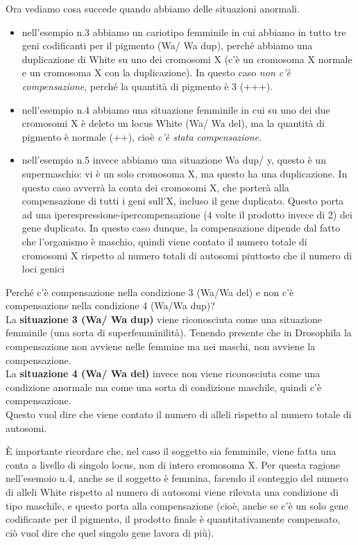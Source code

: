 \documentclass[11pt]{book}
\begin{document}
Ora vediamo cosa succede quando abbiamo delle situazioni anormali.

\begin{itemize}
\item nell'esempio n.3 abbiamo un cariotipo femminile in cui abbiamo in tutto tre geni codificanti per il pigmento (Wa/ Wa dup), perché abbiamo una duplicazione di White su uno dei cromosomi X (c’è un cromosoma X normale e un cromosoma X con la duplicazione). In questo caso \emph{non c’è compensazione}, perché la quantità di pigmento è 3 (+++).
\item nell'esempio n.4 abbiamo una situazione femminile in cui su uno dei due cromosomi X è deleto un locus White (Wa/ Wa del), ma la quantità di pigmento è normale (++), cioè \emph{c’è stata compensazione.}
\item nell'esempio n.5 invece abbiamo una situazione Wa dup/ y, questo è un supermaschio: vi è un solo cromosoma X, ma questo ha una duplicazione. In questo caso avverrà la conta dei cromosomi X, che porterà alla compensazione di tutti i geni sull'X, incluso il gene duplicato. Questo porta ad una iperespressione-ipercompensazione (4 volte il prodotto invece di 2) dei gene duplicato. In questo caso dunque, la compensazione dipende dal fatto che l'organismo è maschio, quindi viene contato il numero totale di cromosomi X rispetto al numero totali di autosomi piuttosto che il numero di loci genici
\end{itemize}

Perché c’è compensazione nella condizione 3 (Wa/Wa del) e non c’è compensazione nella condizione 4 (Wa/Wa dup)?\\
La \textbf{situazione 3 (Wa/ Wa dup)} viene riconosciuta come una situazione femminile (una sorta di superfemminilità). Tenendo presente che in Drosophila la compensazione non avviene nelle femmine ma nei maschi, non avviene la compensazione.\\
La \textbf{situazione 4 (Wa/ Wa del)} invece non viene riconosciuta come una condizione anormale ma come una sorta di condizione maschile, quindi c’è compensazione.\\
Questo vuol dire che viene contato il numero di alleli rispetto al numero totale di autosomi.

È importante ricordare che, nel caso il soggetto sia femminile, viene fatta una conta a livello di singolo locus, non di intero cromosoma X. Per questa ragione nell'esemoio n.4, anche se il soggetto è femmina, facendo il conteggio del numero di alleli White rispetto al numero di autosomi viene rilevata una condizione di tipo maschile, e questo porta alla compensazione (cioè, anche se c’è un solo gene codificante per il pigmento, il prodotto finale è quantitativamente compensato, ciò vuol dire che quel singolo gene lavora di più).
\end{document}

